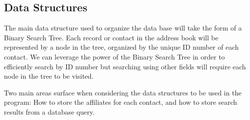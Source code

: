 \documentclass[11pt]{article}
\begin{document}
\subsection*{Data Structures}

	The main data structure used to organize the data base will take the form of a Binary Search Tree. Each record or contact
in the address book will be represented by a node in the tree, organized by the unique ID number of each contact. We can
leverage the power of the Binary Search Tree in order to efficiently search by ID number but searching using other fields
will require each node in the tree to be visited.
	
	Two main areas surface when considering the data structures to be used in the program: How to store the affiliates for
 each contact, and how to store search results from a database query.
	
\end{document}
